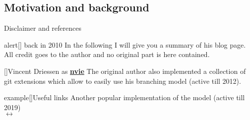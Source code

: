 \documentclass[usenames,svgnames,14pt]{beamer}
\begin{document}
\subsection{Motivation and background}
\begin{frame}{Disclaimer and references}
    \PrepareURLsymbol[PT]
    \begin{varblock}{alert}[\textwidth]{ back in 2010}
        In the following I will give you a summary of his blog page.\\
        All credit goes to the author and no original part is here contained.
    \end{varblock}
    \vspace{-1mm}
    \begin{varblock}{}[\textwidth]{Vincent Driessen as \;\href{https://github.com/nvie/gitflow}{\faGithub\;\textbf{nvie}}}
        The original author also implemented a collection of git extensions which allow to easily use his branching model (active till 2012).
    \end{varblock}
    \vspace{-1mm}
    \PrepareURLsymbol[PS]
    \begin{varblock}{example}[\textwidth]{Useful links}
        Another popular implementation of the model (active till 2019)\\
        \;$\longleftrightarrow$\;
    \end{varblock}
\end{frame}
\end{document}
